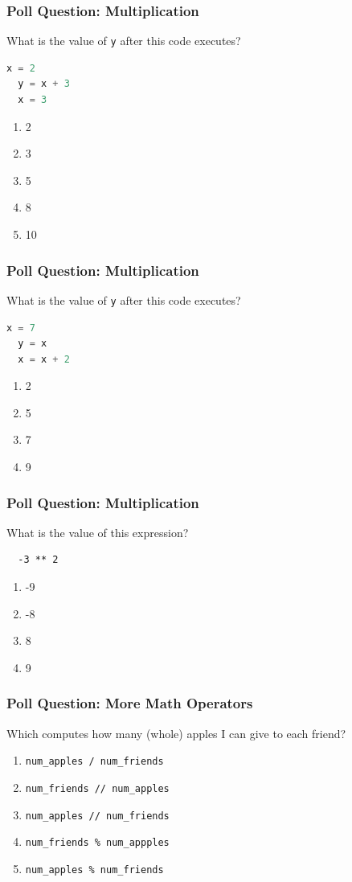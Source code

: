 \documentclass{beamer}
\begin{document}
%
%
%
\begin{frame}[fragile]
  \frametitle{Poll Question: Multiplication}
  \vfill
  What is the value of \lstinline|y| after this code executes?
  \begin{lstlisting}[language=Python, autogobble]
  x = 2
  y = x + 3
  x = 3
  \end{lstlisting}
  \vfill
  \begin{enumerate}[A]
    \item 2 
    \item 3
    \item 5
    \item 8
    \item 10
  \end{enumerate}
\end{frame}


%
%
%
\begin{frame}[fragile]
  \frametitle{Poll Question: Multiplication}
  \vfill
  What is the value of \lstinline|y| after this code executes?
  \begin{lstlisting}[language=Python, autogobble]
  x = 7
  y = x
  x = x + 2
  \end{lstlisting}
  \vfill
  \begin{enumerate}
    \item 2
    \item 5 
    \item 7
    \item 9
  \end{enumerate}
\end{frame}

%
%
%
\begin{frame}[fragile]
  \frametitle{Poll Question: Multiplication}
  \vfill
  What is the value of this expression?
  \begin{lstlisting}
  -3 ** 2
  \end{lstlisting}
  \vfill
  \begin{enumerate}
    \item -9
    \item -8
    \item 8
    \item 9
  \end{enumerate}
\end{frame}


%
%
%
\begin{frame}[fragile]
  \frametitle{Poll Question: More Math Operators}
  \vfill
  Which computes how many (whole) apples I can give to each friend?
  \begin{enumerate}
    \item \lstinline|num_apples / num_friends|
    \item \lstinline|num_friends // num_apples|
    \item \lstinline|num_apples // num_friends|
    \item \lstinline|num_friends % num_appples|
    \item \lstinline|num_apples % num_friends|
  \end{enumerate}
\end{frame}
\end{document}
